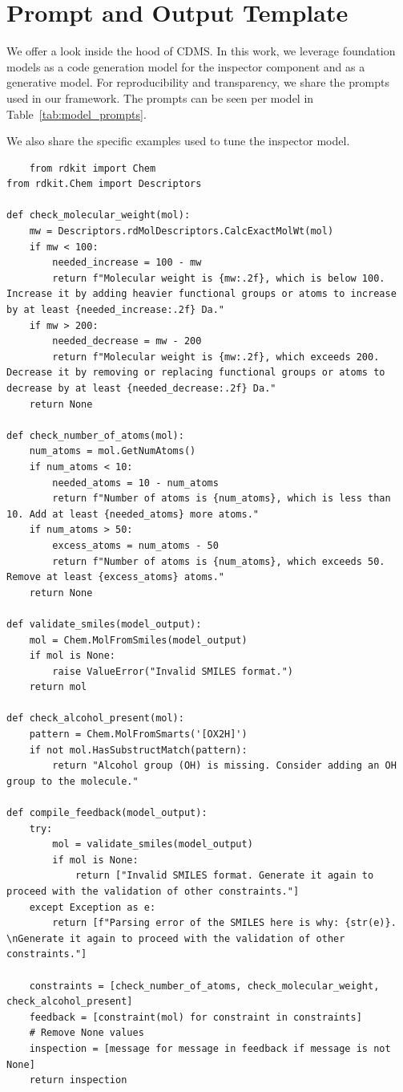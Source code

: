 \documentclass[10pt]{article} %
\begin{document}



    \appendix


    \section{Prompt and Output Template}
    \label{app:model_prompts}
    We offer a look inside the hood of CDMS. In this work, we leverage foundation models as a code generation model for the inspector component and as a generative model. For reproducibility and transparency, we share the prompts used in our framework. The prompts can be seen per model in Table~\ref{tab:model_prompts}.


    We also share the specific examples used to tune the inspector model.

    \begin{lstlisting}
    from rdkit import Chem
from rdkit.Chem import Descriptors

def check_molecular_weight(mol):
    mw = Descriptors.rdMolDescriptors.CalcExactMolWt(mol)
    if mw < 100:
        needed_increase = 100 - mw
        return f"Molecular weight is {mw:.2f}, which is below 100. Increase it by adding heavier functional groups or atoms to increase by at least {needed_increase:.2f} Da."
    if mw > 200:
        needed_decrease = mw - 200
        return f"Molecular weight is {mw:.2f}, which exceeds 200. Decrease it by removing or replacing functional groups or atoms to decrease by at least {needed_decrease:.2f} Da."
    return None

def check_number_of_atoms(mol):
    num_atoms = mol.GetNumAtoms()
    if num_atoms < 10:
        needed_atoms = 10 - num_atoms
        return f"Number of atoms is {num_atoms}, which is less than 10. Add at least {needed_atoms} more atoms."
    if num_atoms > 50:
        excess_atoms = num_atoms - 50
        return f"Number of atoms is {num_atoms}, which exceeds 50. Remove at least {excess_atoms} atoms."
    return None

def validate_smiles(model_output):
    mol = Chem.MolFromSmiles(model_output)
    if mol is None:
        raise ValueError("Invalid SMILES format.")
    return mol

def check_alcohol_present(mol):
    pattern = Chem.MolFromSmarts('[OX2H]')
    if not mol.HasSubstructMatch(pattern):
        return "Alcohol group (OH) is missing. Consider adding an OH group to the molecule."

def compile_feedback(model_output):
    try:
        mol = validate_smiles(model_output)
        if mol is None:
            return ["Invalid SMILES format. Generate it again to proceed with the validation of other constraints."]
    except Exception as e:
        return [f"Parsing error of the SMILES here is why: {str(e)}. \nGenerate it again to proceed with the validation of other constraints."]

    constraints = [check_number_of_atoms, check_molecular_weight, check_alcohol_present]
    feedback = [constraint(mol) for constraint in constraints]
    # Remove None values
    inspection = [message for message in feedback if message is not None]
    return inspection
    \end{lstlisting}
\end{document}
